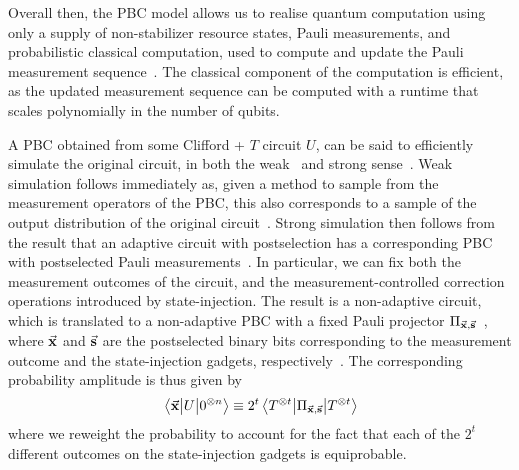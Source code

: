 Overall then, the PBC model allows us to realise quantum computation using only a supply of non-stabilizer resource states, Pauli measurements, and probabilistic classical computation, used to compute and update the Pauli measurement sequence~\cite{Yoganathan2019}. The classical component of the computation is efficient, as the updated measurement sequence can be computed with a runtime that scales polynomially in the number of qubits.\par
A PBC obtained from some Clifford + $T$ circuit $U$, can be said to efficiently simulate the original circuit, in both the weak~\cite{Yoganathan2019} and strong sense~\cite{Bravyi2015}. Weak simulation follows immediately as, given a method to sample from the measurement operators of the PBC, this also corresponds to a sample of the output distribution of the original circuit~\cite{Yoganathan2019}. Strong simulation then follows from the result that an adaptive circuit with postselection has a corresponding PBC with postselected Pauli measurements~\cite{Yoganathan2019}. In particular, we can fix both the measurement outcomes of the circuit, and the measurement-controlled correction operations introduced by state-injection. The result is a non-adaptive circuit, which is translated to a non-adaptive PBC with a fixed Pauli projector $\Pi_{\va{x},\va{s}}$~\cite{Yoganathan2019}, where $\va{x}$ and $\va{s}$ are the postselected binary bits corresponding to the measurement outcome and the state-injection gadgets, respectively~\cite{Bravyi2016,Bravyi2015}. The corresponding probability amplitude is thus given by
\begin{equation}
\matrixel{\va{x}}{U}{0^{\otimes n}}\equiv 2^{t}\matrixel{T^{\otimes t}}{\Pi_{\va{x},\va{s}}}{T^{\otimes t}}
\label{eq:pbc_strongsim}
\end{equation}
where we reweight the probability to account for the fact that each of the $2^{t}$ different outcomes on the state-injection gadgets is equiprobable.
